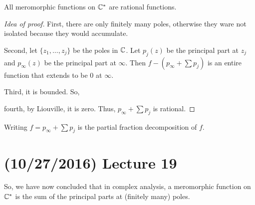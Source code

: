 \documentclass[11pt,leqno,oneside]{amsart}
\numberwithin{thm}{section}
\begin{document}
  \begin{prop}
    All meromorphic functions on ${\mathbb C}^*$ are rational functions.
  \end{prop}
  \begin{proof}[Idea of proof]
    First, there are only finitely many poles, otherwise they ware not
    isolated because they would accumulate.

    Second, let $\{z_1, \ldots, z_j\}$ be the poles in ${\mathbb C}$. Let
    $p_j(z)$ be the principal part at $z_j$ and $p_\infty(z)$ be the
    principal part at $\infty$. Then $f - (p_\infty + \sum p_j)$ is an
    entire function that extends to be 0 at $\infty$.

    Third, it is bounded. So,

    fourth, by Liouville, it is zero. Thus, $p_\infty + \sum p_j$ is rational.
  \end{proof}
  Writing $f = p_\infty + \sum p_j$ is the partial fraction
  decomposition of $f$.
  \section{(10/27/2016) Lecture 19}
  So, we have now concluded that in complex analysis, a meromorphic
  function on ${\mathbb C}^*$ is the sum of the principal parts at (finitely
  many) poles.
\end{document}
